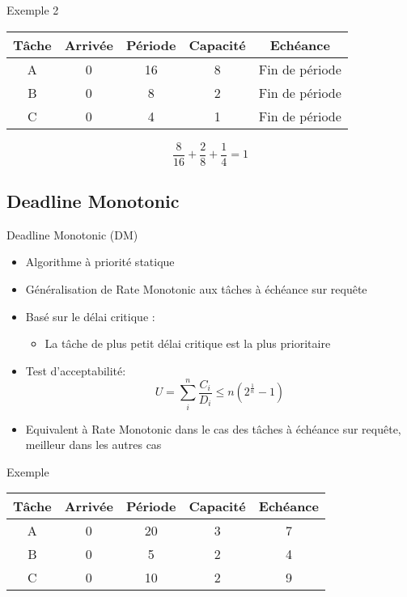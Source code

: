 \begin{frame}{Exemple 2}
    \begin{center}
      \begin{tabular}{ccccc}
        \hline
        Tâche & Arrivée & Période & Capacité & Echéance \\
        \hline
        A & 0 & 16 & 8 & Fin de période\\
        B & 0 &  8 & 2 & Fin de période\\
        C & 0 &  4 & 1 & Fin de période\\
        \hline
      \end{tabular}
    \end{center}
    $$\frac{8}{16} + \frac{2}{8} + \frac{1}{4} = 1$$
\end{frame}

\subsection{Deadline Monotonic}

\begin{frame}{Deadline Monotonic (DM)} 
  \begin{itemize}
  \item Algorithme à priorité statique
\item Généralisation de Rate Monotonic aux tâches à échéance sur requête
  \item Basé sur le délai critique :
    \begin{itemize}
    \item La tâche de plus petit délai critique est la plus prioritaire
    \end{itemize}
\item Test d'acceptabilité:
  $$U = \sum_i^n \frac{C_i}{D_i} \leq n \left(2^{\frac{1}{n}}-1\right)$$
  \item Equivalent à Rate Monotonic  dans le cas des tâches à échéance
    sur requête, meilleur dans les autres cas
  \end{itemize}
\end{frame}

\begin{frame}{Exemple}
  \begin{center}
    \begin{tabular}{ccccc}
      \hline
      Tâche & Arrivée & Période & Capacité & Echéance \\
      \hline
      A & 0 & 20 & 3 & 7\\
      B & 0 &  5 & 2 & 4\\
      C & 0 & 10 & 2 & 9\\
      \hline
    \end{tabular}
  \end{center}
\end{frame} 

